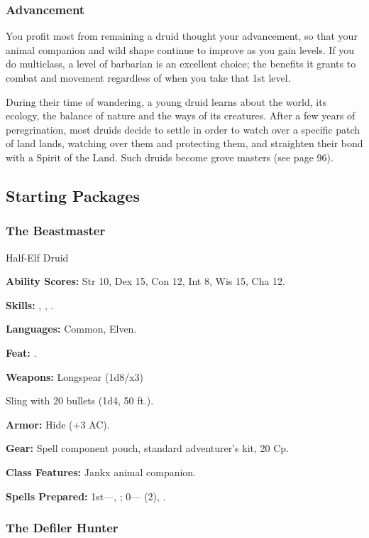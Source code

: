 \subsubsection{Advancement}

You profit most from remaining a druid thought your advancement, so that your animal companion and wild shape continue to improve as you gain levels. If you do multiclass, a level of barbarian is an excellent choice; the benefits it grants to combat and movement regardless of when you take that 1st level.

During their time of wandering, a young druid learns about the world, its ecology, the balance of nature and the ways of its creatures. After a few years of peregrination, most druids decide to settle in order to watch over a specific patch of land lands, watching over them and protecting them, and straighten their bond with a Spirit of the Land. Such druids become grove masters (see page 96).

\subsection{Starting Packages}
\subsubsection{The Beastmaster}

Half-Elf Druid

\textbf{Ability Scores:} Str 10, Dex 15, Con 12, Int 8, Wis 15, Cha 12.

\textbf{Skills:} , , .

\textbf{Languages:} Common, Elven.

\textbf{Feat:} .

\textbf{Weapons:} Longspear (1d8/x3)

Sling with 20 bullets (1d4, 50 ft.).

\textbf{Armor:} Hide (+3 AC).

\textbf{Gear:} Spell component pouch, standard adventurer's kit, 20 Cp.

\textbf{Class Features:} Jankx animal companion.

\textbf{Spells Prepared:} 1st---, ; 0--- (2), .

\subsubsection{The Defiler Hunter}

